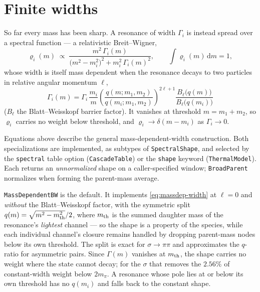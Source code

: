 \documentclass[11pt]{article}
\begin{document}
\section{Finite widths}
\label{sec:width}

So far every mass has been sharp.  A resonance of width $\Gamma_i$ is
instead spread over a spectral function --- a relativistic Breit--Wigner,
\begin{equation}
\varrho_i(m)\;\propto\;
\frac{m^2\,\Gamma_i(m)}
{\big(m^2-m_i^2\big)^2+m_i^2\,\Gamma_i(m)^2},
\qquad
\int\varrho_i(m)\,\mathrm{d}m=1,
\end{equation}
whose width is itself mass dependent when the resonance decays to two
particles in relative angular momentum $\ell$,
\begin{equation}
\Gamma_i(m)=\Gamma_i\,\frac{m_i}{m}
\left(\frac{q(m;m_1,m_2)}{q(m_i;m_1,m_2)}\right)^{2\ell+1}
\frac{B_\ell\big(q(m)\big)}{B_\ell\big(q(m_i)\big)}
\label{eq:massdep-width}
\end{equation}
($B_\ell$ the Blatt--Weisskopf barrier factor).  It vanishes at threshold
$m=m_1+m_2$, so $\varrho_i$ carries no weight below threshold, and
$\varrho_i\to\delta(m-m_i)$ as $\Gamma_i\to0$.

Equations above describe the general mass-dependent-width construction.
Both specializations are implemented, as subtypes of
\texttt{SpectralShape}, and selected by the \texttt{spectral} table option
(\texttt{CascadeTable}) or the \texttt{shape} keyword
(\texttt{ThermalModel}).  Each returns an \emph{unnormalized} shape on a
caller-specified window; \texttt{BroadParent} normalizes when forming the
parent-mass average.

\texttt{MassDependentBW} is the default.  It implements
\eqref{eq:massdep-width} at $\ell=0$ and \emph{without} the Blatt--Weisskopf
factor, with the symmetric split $q(m)=\sqrt{m^{2}-m_{\rm th}^{2}}/2$, where
$m_{\rm th}$ is the summed daughter mass of the resonance's \emph{lightest}
channel --- so the shape is a property of the species, while each individual
channel's closure remains handled by dropping parent-mass nodes below its own
threshold.  The split is exact for $\sigma\to\pi\pi$ and approximates the
$q$-ratio for asymmetric pairs.  Since $\Gamma(m)$ vanishes at $m_{\rm th}$,
the shape carries no weight where the state cannot decay; for the $\sigma$
that removes the $2.56\%$ of constant-width weight below $2m_\pi$.  A
resonance whose pole lies at or below its own threshold has no $q(m_i)$ and
falls back to the constant shape.
\end{document}
